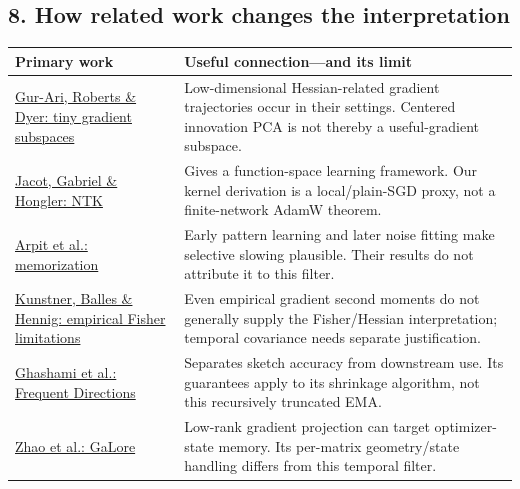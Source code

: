 \documentclass[
  british,
  10pt,
  a4paper,
]{article}
\newcounter{none} %
\begin{document}
\subsection{8. How related work changes the
interpretation}\label{mathematics--how-related-work-changes-the-interpretation}

{\def\LTcaptype{none} %
\begin{longtable}[]{@{}
  >{\raggedright\arraybackslash}p{}
  >{\raggedright\arraybackslash}p{}@{}}
\toprule\noalign{}
\begin{minipage}[b]{\linewidth}\raggedright
Primary work
\end{minipage} & \begin{minipage}[b]{\linewidth}\raggedright
Useful connection---and its limit
\end{minipage} \\
\midrule\noalign{}
\endhead
\bottomrule\noalign{}
\endlastfoot
\href{https://arxiv.org/abs/1812.04754}{Gur-Ari, Roberts \& Dyer: tiny
gradient subspaces} & Low-\allowbreak{}dimensional
Hessian-\allowbreak{}related gradient trajectories occur in their
settings. Centered innovation PCA is not thereby a
useful-\allowbreak{}gradient subspace. \\
\href{https://arxiv.org/abs/1806.07572}{Jacot, Gabriel \& Hongler: NTK}
& Gives a function-\allowbreak{}space learning framework. Our kernel
derivation is a local/\allowbreak{}plain-\allowbreak{}SGD proxy, not a
finite-\allowbreak{}network AdamW theorem. \\
\href{https://arxiv.org/abs/1706.05394}{Arpit et al.: memorization} &
Early pattern learning and later noise fitting make selective slowing
plausible. Their results do not attribute it to this filter. \\
\href{https://arxiv.org/abs/1905.12558}{Kunstner, Balles \& Hennig:
empirical Fisher limitations} & Even empirical gradient second moments
do not generally supply the Fisher/\allowbreak{}Hessian interpretation;
temporal covariance needs separate
justificatio\allowbreak{}n.\allowbreak{} \\
\href{https://arxiv.org/abs/1501.01711}{Ghashami et al.: Frequent
Directions} & Separates sketch accuracy from downstream use. Its
guarantees apply to its shrinkage algorithm, not this recursively
truncated EMA. \\
\href{https://arxiv.org/abs/2403.03507}{Zhao et al.: GaLore} & Low-rank
gradient projection can target optimizer-\allowbreak{}state memory. Its
per-matrix geometry/\allowbreak{}state handling differs from this
temporal filter. \\
\end{longtable}
}
\end{document}
